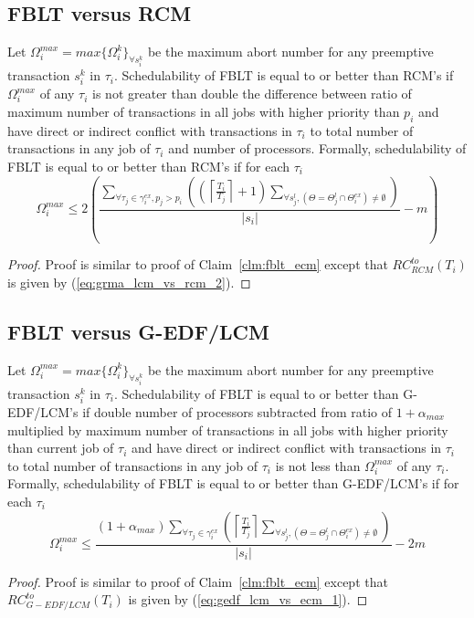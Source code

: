 \subsection{FBLT versus RCM}\label{subsec:fblt_vs_rcm}
%
\begin{clm}\label{clm:fblt_rcm}
%
Let $\Omega_i^{max}=max\{\Omega_i^k\}_{\forall s_i^k}$ be the maximum abort number for any preemptive transaction $s_i^k$ in $\tau_i$. Schedulability of FBLT is equal to or better than RCM's if $\Omega_i^{max}$ of any $\tau_i$ is not greater than double the difference between ratio of maximum number of transactions in all jobs with higher priority than $p_{i}$ and have direct or indirect conflict with transactions in $\tau_{i}$ to total number of transactions in any job of $\tau_i$ and number of processors. Formally, schedulability of FBLT is equal to or better than RCM's if for each $\tau_i$ 
%
\begin{equation}
\Omega_{i}^{max}\le2\left(\frac{\sum_{\forall\tau_{j}\in\gamma_{i}^{ex},p_{j}>p_{i}}\left(\left(\left\lceil \frac{T_{i}}{T_{j}}\right\rceil +1\right)\sum_{\forall s_{j}^{l},\left(\Theta=\Theta_{j}^{l}\cap\Theta_{i}^{ex}\right)\neq\emptyset}\right)}{|s_{i}|}-m\right)
\label{eq:fblt_ecm_comp_4}
\end{equation}
\end{clm}
%
\begin{proof}
%
Proof is similar to proof of Claim~\ref{clm:fblt_ecm} except that $RC_{RCM}^{to}(T_i)$ is given by (\ref{eq:grma_lcm_vs_rcm_2}).
%
\end{proof}
%
\subsection{FBLT versus G-EDF/LCM}\label{subsec:fblt_vs_gedf_lcm}
%
\begin{clm}\label{clm:fblt_lcm_edf}
%
Let $\Omega_i^{max}=max\{\Omega_i^k\}_{\forall s_i^k}$ be the maximum abort number for any preemptive transaction $s_i^k$ in $\tau_i$. Schedulability of FBLT is equal to or better than G-EDF/LCM's if double number of processors subtracted from ratio of $1+\alpha_{max}$ multiplied by maximum number of transactions in all jobs with higher priority than current job of $\tau_{i}$ and have direct or indirect conflict with transactions in $\tau_{i}$ to total number of transactions in any job of $\tau_i$ is not less than $\Omega_i^{max}$ of any $\tau_i$. Formally, schedulability of FBLT is equal to or better than G-EDF/LCM's if for each $\tau_i$ 
%
\begin{equation}
\Omega_{i}^{max}\le\frac{\left(1+\alpha_{max}\right)\sum_{\forall\tau_{j}\in\gamma_{i}^{ex}}\left(\left\lceil \frac{T_{i}}{T_{j}}\right\rceil \sum_{\forall s_{j}^{l},\left(\Theta=\Theta_{j}^{l}\cap\Theta_{i}^{ex}\right)\neq\emptyset}\right)}{|s_{i}|}-2m
\label{eq:fblt_ecm_comp_4}
\end{equation}
%
\end{clm}
%
\begin{proof}
%
Proof is similar to proof of Claim~\ref{clm:fblt_ecm} except that $RC_{G-EDF/LCM}^{to}(T_i)$ is given by (\ref{eq:gedf_lcm_vs_ecm_1}).
%
\end{proof}
%
